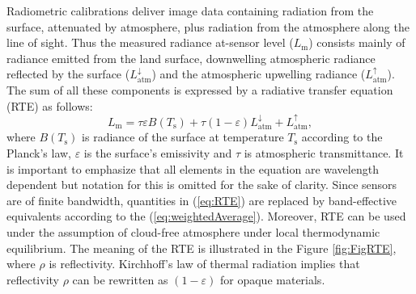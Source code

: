 Radiometric calibrations deliver image data containing radiation from the surface, attenuated by atmosphere, plus radiation from the atmosphere along the line of sight. Thus the measured radiance at-sensor level ($L_\mathrm{m}$) consists mainly of radiance emitted from the land surface, downwelling atmospheric radiance reflected by the surface ($L^\downarrow_\mathrm{atm}$) and the atmospheric upwelling radiance ($L^\uparrow_\mathrm{atm}$). The sum of all these components is expressed by a radiative transfer equation (RTE) as follows:
\begin{equation} 
\label{eq:RTE}
L_\mathrm{m} = \tau \varepsilon B(T_\mathrm{s}) + \tau (1 - \varepsilon) L^\downarrow_\mathrm{atm} + L^\uparrow_\mathrm{atm},
\end{equation}
where $B(T_\mathrm{s})$ is radiance of the surface at temperature $T_\mathrm{s}$ according to the Planck's law, $\varepsilon$ is the surface's emissivity and $\tau$ is atmospheric transmittance. It is important to emphasize that all elements in the equation are wavelength dependent but notation for this is omitted for the sake of clarity. Since sensors are of finite bandwidth, quantities in (\ref{eq:RTE}) are replaced by band-effective equivalents according to the (\ref{eq:weightedAverage}). Moreover, RTE can be used under the assumption of cloud-free atmosphere under local thermodynamic equilibrium. The meaning of the RTE is illustrated in the Figure \ref{fig:FigRTE}, where $\rho$ is reflectivity. Kirchhoff's law of thermal radiation implies that reflectivity $\rho$ can be rewritten as $(1 - \varepsilon)$ for opaque materials.

